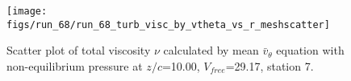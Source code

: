 \begin{figure}[H]
\centering
\texttt{[image: figs/run\_68/run\_68\_turb\_visc\_by\_vtheta\_vs\_r\_meshscatter]}
\caption{Scatter plot of total viscosity $\nu$ calculated by mean $\bar{v}_{\theta}$ equation with non-equilibrium pressure at $z/c$=10.00, $V_{free}$=29.17, station 7.}
\label{fig:run_68_turb_visc_by_vtheta_vs_r_meshscatter}
\end{figure}


